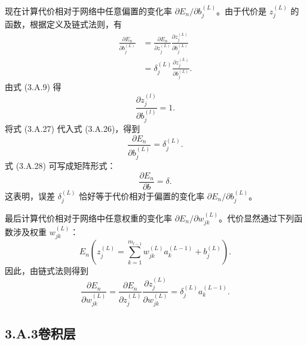 现在计算代价相对于网络中任意偏置的变化率 $\partial E_n/\partial b_j^{(L)}$。由于代价是 $z_j^{(L)}$ 的函数，根据定义及链式法则，有
\begin{equation}
\begin{aligned}
\frac{\partial E_n}{\partial b_j^{(L)}}
&=\frac{\partial E_n}{\partial z_j^{(L)}}\frac{\partial z_j^{(L)}}{\partial b_j^{(L)}}\\
&=\delta_j^{(L)}\frac{\partial z_j^{(L)}}{\partial b_j^{(L)}}.
\end{aligned}
\tag{3.A.26}
\end{equation}
由式 (3.A.9) 得
\begin{equation}
\frac{\partial z_j^{(l)}}{\partial b_j^{(l)}}=1.
\tag{3.A.27}
\end{equation}
将式 (3.A.27) 代入式 (3.A.26)，得到
\begin{equation}
\frac{\partial E_n}{\partial b_j^{(L)}}=\delta_j^{(L)}.
\tag{3.A.28}
\end{equation}
式 (3.A.28) 可写成矩阵形式：
\begin{equation}
\frac{\partial E_n}{\partial b}=\delta.
\tag{3.A.29}
\end{equation}
这表明，误差 $\delta_j^{(L)}$ 恰好等于代价相对于偏置的变化率 $\partial E_n/\partial b_j^{(L)}$。

最后计算代价相对于网络中任意权重的变化率 $\partial E_n/\partial w_{jk}^{(L)}$。代价显然通过下列函数涉及权重 $w_{jk}^{(L)}$：
\[
E_n\left(z_j^{(L)}=\sum_{k=1}^{m_{l-1}}w_{jk}^{(L)}a_k^{(L-1)}+b_j^{(L)}\right).
\]
因此，由链式法则得到
\begin{equation}
\frac{\partial E_n}{\partial w_{jk}^{(L)}}
=\frac{\partial E_n}{\partial z_j^{(L)}}\frac{\partial z_j^{(L)}}{\partial w_{jk}^{(L)}}
=\delta_j^{(L)}a_k^{(L-1)}.
\tag{3.A.30}
\end{equation}

\subsection*{3.A.3\quad 卷积层}

